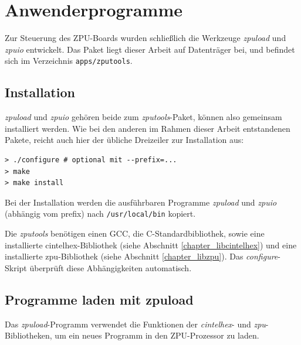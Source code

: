 \documentclass[11pt]{scrartcl}
\begin{document}
\subsubsection{}


\pagebreak
\section{Anwenderprogramme}

Zur Steuerung des ZPU-Boards wurden schließlich die Werkzeuge \emph{zpuload}   und \emph{zpuio} entwickelt. Das Paket liegt dieser Arbeit auf Datenträger bei, und befindet sich im Verzeichnis \texttt{apps/zputools}.

\subsection{Installation}

\emph{zpuload} und \emph{zpuio} gehören beide zum \emph{zputools}-Paket, können also gemeinsam installiert werden. Wie bei den anderen im Rahmen dieser Arbeit entstandenen Pakete, reicht auch hier der übliche Dreizeiler zur Installation aus:

\begin{lstlisting}[caption=Installation der zputools-Werkzeuge]
> ./configure # optional mit --prefix=...
> make
> make install
\end{lstlisting}

Bei der Installation werden die ausführbaren Programme \emph{zpuload} und \emph{zpuio} (abhängig vom prefix) nach \texttt{/usr/local/bin} kopiert.

Die \emph{zputools} benötigen einen GCC, die C-Standardbibliothek, sowie eine installierte cintelhex-Bibliothek (siehe Abschnitt \ref{chapter_libcintelhex}) und eine installierte zpu-Bibliothek (siehe Abschnitt \ref{chapter_libzpu}). Das \emph{configure}-Skript überprüft diese Abhängigkeiten automatisch.

\subsection{Programme laden mit zpuload}

Das \emph{zpuload}-Programm verwendet die Funktionen der \emph{cintelhex}- und \emph{zpu}-Bibliotheken, um ein neues Programm in den ZPU-Prozessor zu laden.
\end{document}

